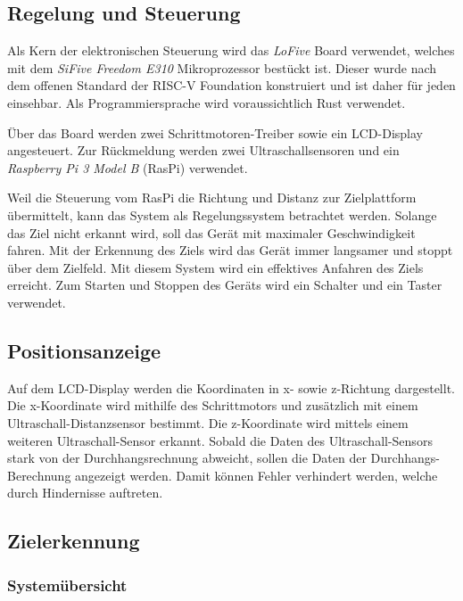 \documentclass[a4paper]{report}
\begin{document}
\subsection{Regelung und Steuerung}

Als Kern der elektronischen Steuerung wird das \textit{LoFive} Board verwendet, welches mit dem \textit{SiFive Freedom E310} Mikroprozessor bestückt ist. Dieser wurde nach dem offenen Standard der RISC-V Foundation konstruiert und ist daher für jeden einsehbar. Als Programmiersprache wird voraussichtlich Rust verwendet.

Über das Board werden zwei Schrittmotoren-Treiber sowie ein LCD-Display angesteuert. Zur Rückmeldung werden zwei Ultraschallsensoren und ein \textit{Raspberry Pi 3 Model B} (RasPi) verwendet.

Weil die Steuerung vom RasPi die Richtung und Distanz zur Zielplattform übermittelt, kann das System als Regelungssystem betrachtet werden. Solange das Ziel nicht erkannt wird, soll das Gerät mit maximaler Geschwindigkeit fahren. Mit der Erkennung des Ziels wird das Gerät immer langsamer und stoppt über dem Zielfeld. Mit diesem System wird ein effektives Anfahren des Ziels erreicht. Zum Starten und Stoppen des Geräts wird ein Schalter und ein Taster verwendet.

\subsection{Positionsanzeige}

Auf dem LCD-Display werden die Koordinaten in x- sowie z-Richtung dargestellt. Die x-Koordinate wird mithilfe des Schrittmotors und zusätzlich mit einem Ultraschall-Distanzsensor bestimmt. Die z-Koordinate wird mittels einem weiteren Ultraschall-Sensor erkannt. Sobald die Daten des Ultraschall-Sensors stark von der Durchhangsrechnung abweicht, sollen die Daten der Durchhangs-Berechnung angezeigt werden. Damit können Fehler verhindert werden, welche durch Hindernisse auftreten.

\newpage
\subsection{Zielerkennung}
\subsubsection{Systemübersicht}
\end{document}
